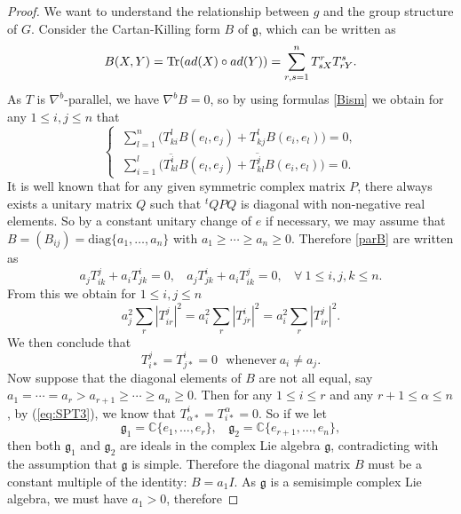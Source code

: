 \documentclass[10pt,a4paper]{amsart}
\newcommand{\ad}{\rm {ad}}
\renewcommand{\gg}{\mathfrak g}
\begin{document}
\begin{proof}
We want to understand the relationship between $g$ and the group structure of $G$.  Consider the Cartan-Killing form $B$ of $\gg$, which can be written as
\begin{equation} \label{eq:Killing}
B(X,Y) = \mbox{Tr}(\ad(X)\circ\ad(Y)) =  \sum_{r,s=1}^n T^r_{sX} T^s_{rY}.
\end{equation}
As $T$ is $\nabla^b$-parallel, we have $\nabla^bB =0$, so by using formulas \eqref{Bism} we obtain for any $1\leq i,j\leq n$ that
\begin{equation}\label{parB}
\left\{ \begin{split} \  \sum_{l=1}^n \big(  T^l_{ki}B(e_l,e_j) + T^l_{kj}B(e_i,e_l) \big) = 0,\\
\ \sum_{i=1}^l\big( \overline{T^i_{kl}}B(e_l,e_j) + \overline{T^j_{kl}}B(e_i,e_l)\big)  =0.
\end{split} \right.
\end{equation}
It is well known that for any given symmetric complex matrix $P$, there always exists a unitary matrix $Q$ such that $^t\!Q P Q $ is diagonal with non-negative real elements. So by a constant unitary change of $e$ if necessary, we may assume that $B= (B_{ij}) =\mbox{diag} \{ a_1, \ldots , a_n\}$ with $a_1\geq \cdots \geq a_n\geq 0$. Therefore \eqref{parB} are written as
\begin{equation*}
a_jT^j_{ik} + a_iT^i_{jk} =0 , \ \ \ \ a_jT^i_{jk} + a_iT^j_{ik} =0 , \ \ \ \ \forall \ 1\leq i,j,k\leq n.
\end{equation*}
From this we obtain for $1\leq i,j\leq n$
$$a_j^2\sum_r |T^j_{ir}|^2 = a_i^2 \sum_r |T^i_{jr}|^2 = a_i^2 \sum_r |T^j_{ir}|^2.$$
We then conclude that
\begin{equation} \label{eq:SPT3}
T^j_{i\ast} = T^i_{j\ast} =0  \ \ \ \mbox{whenever} \ a_i\neq a_j.
\end{equation}
Now suppose that the diagonal elements of $B$ are not all equal, say $a_1=\cdots =a_r > a_{r+1} \geq \cdots \geq a_n\geq 0$. Then for any $1\leq i\leq r$ and any $r+1\leq \alpha \leq n$, by (\ref{eq:SPT3}), we know that $T^i_{\alpha \ast } = T^{\alpha}_{i\ast}=0$. So if we let
$${\mathfrak g}_1={\mathbb C}\{ e_1, \ldots , e_r\}, \ \ \ \  {\mathfrak g}_2={\mathbb C}\{ e_{r+1}, \ldots , e_n\}, $$
then both ${\mathfrak g}_1$ and ${\mathfrak g}_2$ are ideals in the complex Lie algebra ${\mathfrak g}$, contradicting with the assumption that ${\mathfrak g}$ is simple. Therefore the diagonal matrix $B$ must be a constant multiple of the identity: $B=a_1I$.  As ${\mathfrak g}$ is a semisimple complex Lie algebra, we must have $a_1>0$, therefore

\end{proof}
\end{document}
